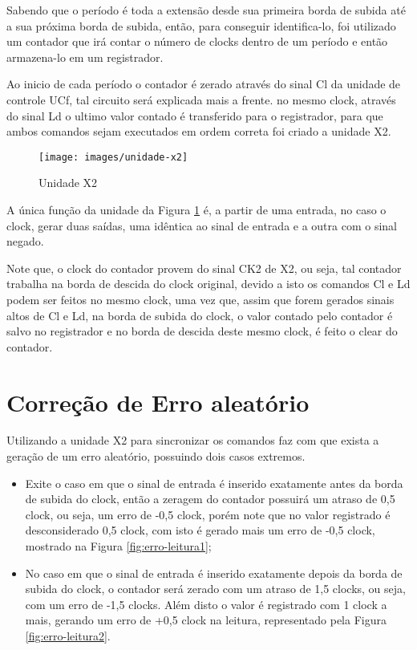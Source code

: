 Sabendo que o período é toda a extensão desde sua primeira
borda de subida até a sua próxima borda de subida, então, para conseguir identifica-lo, foi utilizado um contador que irá contar o número de clocks dentro de um período e então armazena-lo em um registrador.

Ao inicio de cada período o contador é zerado através do sinal Cl da unidade de controle UCf, tal circuito será explicada mais a frente. no mesmo clock, através do sinal Ld o ultimo valor contado é transferido para o registrador, para que ambos comandos sejam executados em ordem correta foi criado a unidade X2.

\begin{figure}[!htp]
	\centering
	\caption{Unidade X2}
	\texttt{[image: images/unidade-x2]}
	\label{fig:unidade-x2}
\end{figure}

A única função da unidade da Figura \ref{fig:unidade-x2} é, a partir de uma entrada, no caso o clock, gerar duas saídas, uma idêntica ao sinal de entrada e a outra com o sinal negado.

Note que, o clock do contador provem do sinal CK2 de X2, ou seja, tal contador trabalha na borda de descida do clock original, devido a isto os comandos Cl e Ld podem ser feitos no mesmo clock, uma vez que, assim que forem gerados sinais altos de Cl e Ld, na borda de subida do clock, o valor contado pelo contador é salvo no registrador e no borda de descida deste mesmo clock, é feito o clear do contador.

\section{Correção de Erro aleatório}

Utilizando a unidade X2 para sincronizar os comandos faz com que exista a geração de um erro aleatório, possuindo dois casos extremos.

\begin{itemize}	
	\item Exite o caso em que o sinal de entrada é inserido exatamente antes da borda de subida do clock, então a zeragem do contador possuirá um atraso de 0,5 clock, ou seja, um erro de -0,5 clock, porém note que no valor registrado é desconsiderado 0,5 clock, com isto é gerado mais um erro de -0,5 clock, mostrado na Figura \ref{fig:erro-leitura1};
\end{itemize}


\begin{itemize}	
	\item No caso em que o sinal de entrada é inserido exatamente depois da borda de subida do clock, o contador será zerado com um atraso de 1,5 clocks, ou seja, com um erro de -1,5 clocks. Além disto o valor é registrado com 1 clock a mais, gerando um erro de +0,5 clock na leitura, representado pela Figura \ref{fig:erro-leitura2}.
\end{itemize}

